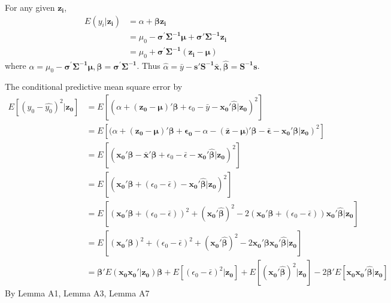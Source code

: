 \documentclass[11pt]{article}
\begin{document}
For any given $\boldsymbol{z_i}$, 
$$\begin{aligned}
E(y_i|\boldsymbol{z_i})&=\alpha + \boldsymbol{\beta z_i}\\
&= \mu_{0}-\boldsymbol{\sigma^{'}\Sigma^{-1}\mu} + \boldsymbol{\sigma'\Sigma^{-1}z_i}\\
&=\mu_0+\boldsymbol{\sigma^{'}\Sigma^{-1}(z_i-\mu)}
\end{aligned}$$
where $\alpha=\mu_{0}-\boldsymbol{\sigma^{'}\Sigma^{-1}\mu}, \boldsymbol{\beta=\sigma^{'}\Sigma^{-1}}$. Thus $\hat{\alpha}=\bar{y}-\boldsymbol{s'S^{-1}\bar{x}},\boldsymbol{\hat{\beta}}=\boldsymbol{S^{-1}s}$.


The conditional predictive mean square error by 
$$\begin{aligned}
E[(y_0-\hat{y_0})^2|\boldsymbol{z_0}]
&=E[(\alpha+\boldsymbol{(z_0-\mu)'\beta}+\epsilon_0-\bar{y}-\boldsymbol{x_{0}'\hat{\beta}}|\boldsymbol{z_0})^2]\\
&=E[(\alpha+\boldsymbol{(z_0-\mu)'\beta+\epsilon_0}-\alpha-(\boldsymbol{\bar{z}-\mu)'\beta-\bar{\epsilon}-x_0'\beta|z_0})^2]\\&=E[(\boldsymbol{x_{0}'\beta}-\boldsymbol{\bar{x}'\beta}+\epsilon_0-\bar{\epsilon}-\boldsymbol{x_{0}'\hat{\beta}}|\boldsymbol{z_0})^2]\\
&=E[(\boldsymbol{x_{0}'\beta}+(\epsilon_0-\bar{\epsilon})-\boldsymbol{x_{0}'\hat{\beta}}|\boldsymbol{z_0})^2]\\
&=E[(\boldsymbol{x_0'\beta}+(\epsilon_0-\bar{\epsilon}))^2+(\boldsymbol{x_0'\hat{\beta}})^2-2(\boldsymbol{x_0'\beta}+(\epsilon_0-\bar{\epsilon}))\boldsymbol{x_0'\hat{\beta}}|\boldsymbol{z_0}]\\
&=E[(\boldsymbol{x_0'\beta})^2+(\epsilon_0-\bar{\epsilon})^2+(\boldsymbol{x_0'\hat{\beta}})^2
-2\boldsymbol{x_0'\beta x_0'\hat{\beta}}|\boldsymbol{z_0}]\\
&=\boldsymbol{\beta'}E(\boldsymbol{x_0x_0'}|\boldsymbol{z_0})\boldsymbol{\beta}+E[(\epsilon_0-\bar{\epsilon})^2|\boldsymbol{z_0}]+E[(\boldsymbol{x_0'\hat{\beta}})^2|\boldsymbol{z_0}]-2\boldsymbol{\beta'}E[\boldsymbol{x_0x_0'\hat{\beta}}|\boldsymbol{z_0}]
\end{aligned}$$
By Lemma A1, Lemma A3, Lemma A7
\end{document}
